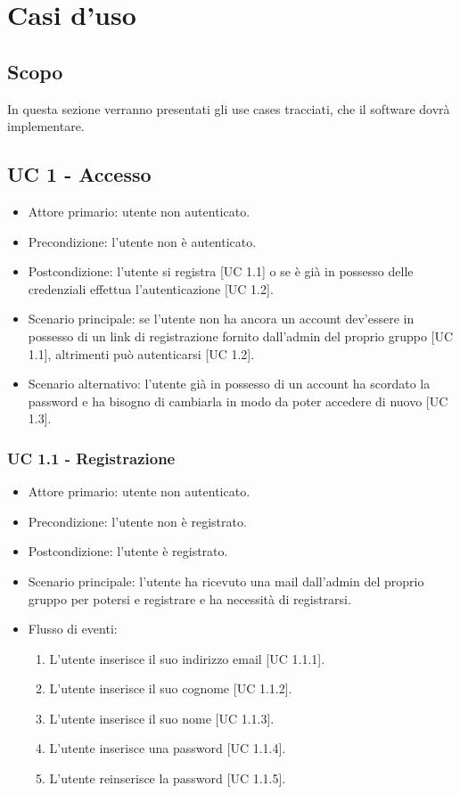 \section{Casi d'uso}
\subsection{Scopo}
In questa sezione verranno presentati gli use cases tracciati, che il software dovrà implementare.
\subsection{UC 1 - Accesso}
    \begin{itemize}
        \item Attore primario: utente non autenticato.
        \item Precondizione: l'utente non è autenticato.
        \item Postcondizione: l'utente si registra [UC 1.1] o se è già in possesso delle credenziali effettua l'autenticazione [UC 1.2].
        \item Scenario principale: se l'utente non ha ancora un account dev'essere in possesso di un link di registrazione fornito dall'admin del proprio gruppo [UC 1.1], altrimenti può autenticarsi [UC 1.2].
        \item Scenario alternativo: l'utente già in possesso di un account ha scordato la password e ha bisogno di cambiarla in modo da poter accedere di nuovo [UC 1.3].
    \end{itemize}
    \subsubsection{UC 1.1 - Registrazione}
        \begin{itemize}
            \item Attore primario: utente non autenticato.
            \item Precondizione: l'utente non è registrato.
            \item Postcondizione: l'utente è registrato.
            \item Scenario principale: l'utente ha ricevuto una mail dall'admin del proprio gruppo per potersi e registrare e ha necessità di registrarsi.
            \item Flusso di eventi:
                \begin{enumerate}
                    \item L'utente inserisce il suo indirizzo email [UC 1.1.1].
                    \item L'utente inserisce il suo cognome [UC 1.1.2].
                    \item L'utente inserisce il suo nome [UC 1.1.3].
                    \item L'utente inserisce una password [UC 1.1.4].
                    \item L'utente reinserisce la password [UC 1.1.5].
                \end{enumerate}
        \end{itemize}

